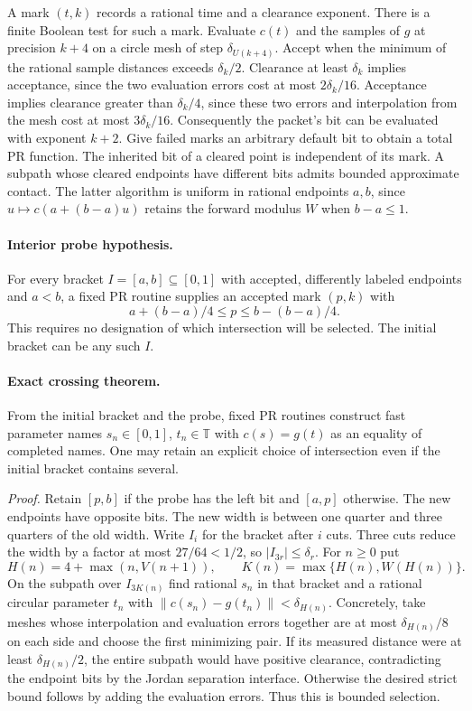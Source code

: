 A mark $(t,k)$ records a rational time and a clearance exponent. There is a
finite Boolean test for such a mark. Evaluate $c(t)$ and the samples of $g$
at precision $k+4$ on a circle mesh of step $\delta_{U(k+4)}$.
Accept when the minimum of the rational sample distances exceeds
$\delta_k/2$. Clearance at least $\delta_k$ implies acceptance, since
the two evaluation errors cost at most $2\delta_k/16$. Acceptance implies
clearance greater than $\delta_k/4$, since these two errors and interpolation
from the mesh cost at most $3\delta_k/16$. Consequently the packet's bit
can be evaluated with exponent $k+2$. Give failed marks an arbitrary default
bit to obtain a total PR function. The inherited bit of a cleared point is independent of its mark. A subpath whose
cleared endpoints have different bits admits bounded approximate contact.
The latter algorithm is uniform in rational endpoints $a,b$, since
$u\mapsto c(a+(b-a)u)$ retains the forward modulus $W$ when $b-a\le1$.

\paragraph{Interior probe hypothesis.}
For every bracket $I=[a,b]\subseteq[0,1]$ with accepted, differently
labeled endpoints and $a<b$, a fixed PR routine supplies an accepted mark
$(p,k)$ with
\[
 a+(b-a)/4\le p\le b-(b-a)/4.
\]
This requires no designation of which intersection will be selected.
The initial bracket can be any such $I$.

\paragraph{Exact crossing theorem.}
From the initial bracket and the probe, fixed PR routines construct fast
parameter names $s_n\in[0,1]$, $t_n\in\mathbb T$ with
$c(s)=g(t)$ as an equality of completed names. One may retain an explicit
choice of intersection even if the initial bracket contains several.

\emph{Proof.}
Retain $[p,b]$ if the probe has the left bit and $[a,p]$ otherwise.
The new endpoints have opposite bits. The new width is between one quarter
and three quarters of the old width. Write $I_i$ for the bracket after $i$
cuts. Three cuts reduce the width by a factor at most $27/64<1/2$, so
$|I_{3r}|\le\delta_r$. For $n\ge0$ put
\[
 H(n)=4+\max(n,V(n+1)),\qquad
 K(n)=\max\{H(n),W(H(n))\}.
\]
On the subpath over $I_{3K(n)}$ find rational $s_n$ in that bracket and a
rational circular parameter $t_n$ with
$\|c(s_n)-g(t_n)\|<\delta_{H(n)}$. Concretely, take meshes whose
interpolation and evaluation errors together are at most $\delta_{H(n)}/8$
on each side and choose the first minimizing pair. If its measured distance
were at least $\delta_{H(n)}/2$, the entire subpath would have positive
clearance, contradicting the endpoint bits by the Jordan separation
interface. Otherwise the desired strict bound follows by adding the
evaluation errors. Thus this is bounded selection.

